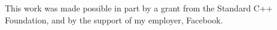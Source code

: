 \setcounter{chapter}{0}

This work was made possible in part by a grant from the Standard C++
Foundation, and by the support of my employer, Facebook.
